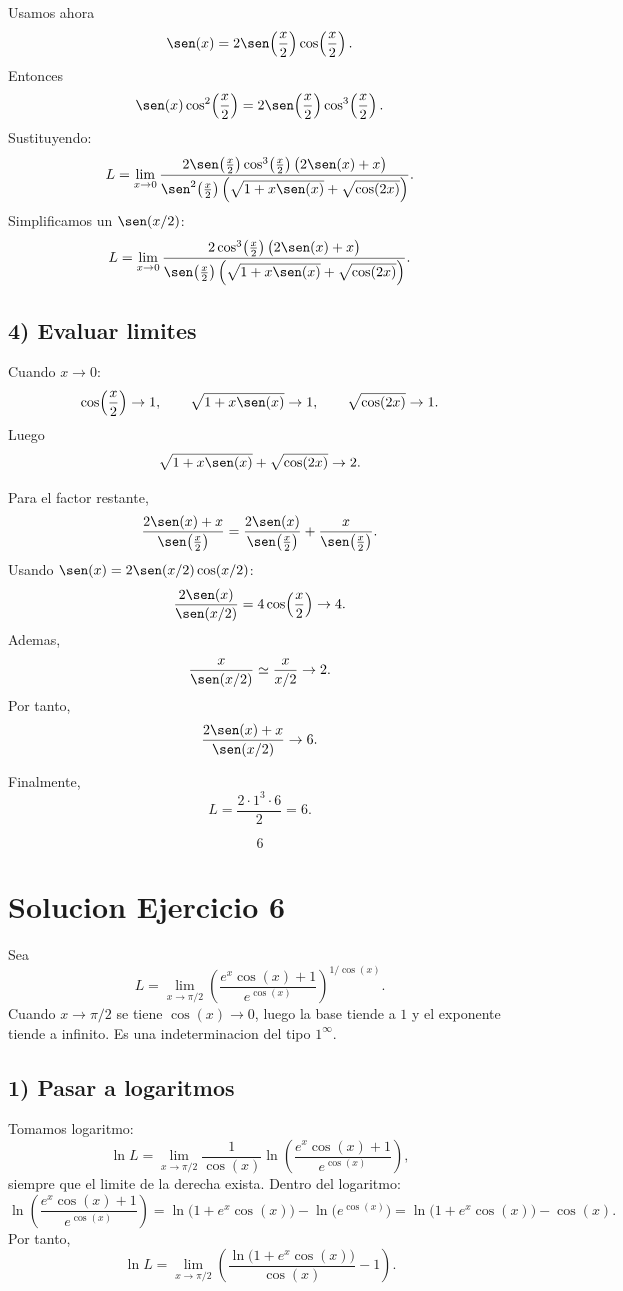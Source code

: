 \documentclass[12pt]{article}
\begin{document}
Usamos ahora
\[
\sen(x)=2\sen\!\left(\frac{x}{2}\right)\cos\!\left(\frac{x}{2}\right).
\]
Entonces
\[
\sen(x)\cos^2\!\left(\frac{x}{2}\right)
=
2\sen\!\left(\frac{x}{2}\right)\cos^3\!\left(\frac{x}{2}\right).
\]
Sustituyendo:
\[
L=\lim_{x\to 0}
\frac{2\sen\!\left(\frac{x}{2}\right)\cos^3\!\left(\frac{x}{2}\right)\bigl(2\sen(x)+x\bigr)}
{\sen^2\!\left(\frac{x}{2}\right)\left(\sqrt{1+x\sen(x)}+\sqrt{\cos(2x)}\right)}.
\]
Simplificamos un $\sen(x/2)$:
\[
L=\lim_{x\to 0}
\frac{2\cos^3\!\left(\frac{x}{2}\right)\bigl(2\sen(x)+x\bigr)}
{\sen\!\left(\frac{x}{2}\right)\left(\sqrt{1+x\sen(x)}+\sqrt{\cos(2x)}\right)}.
\]

\subsection*{4) Evaluar limites}

Cuando $x\to 0$:
\[
\cos\!\left(\frac{x}{2}\right)\to 1,
\qquad
\sqrt{1+x\sen(x)}\to 1,
\qquad
\sqrt{\cos(2x)}\to 1.
\]
Luego
\[
\sqrt{1+x\sen(x)}+\sqrt{\cos(2x)}\to 2.
\]

Para el factor restante,
\[
\frac{2\sen(x)+x}{\sen\!\left(\frac{x}{2}\right)}
=
\frac{2\sen(x)}{\sen\!\left(\frac{x}{2}\right)}
+\frac{x}{\sen\!\left(\frac{x}{2}\right)}.
\]
Usando $\sen(x)=2\sen(x/2)\cos(x/2)$:
\[
\frac{2\sen(x)}{\sen(x/2)}
=4\cos\!\left(\frac{x}{2}\right)\to 4.
\]
Ademas,
\[
\frac{x}{\sen(x/2)} \simeq \frac{x}{x/2}\to 2.
\]
Por tanto,
\[
\frac{2\sen(x)+x}{\sen(x/2)}\to 6.
\]

Finalmente,
\[
L=\frac{2\cdot 1^3\cdot 6}{2}=6.
\]

\[
\boxed{6}
\]
\section*{Solucion Ejercicio 6}

Sea
\[
L=\lim_{x\to \pi/2}\left(\frac{e^x\cos(x)+1}{e^{\cos(x)}}\right)^{1/\cos(x)}.
\]
Cuando $x\to \pi/2$ se tiene $\cos(x)\to 0$, luego la base tiende a $1$ y el exponente tiende a infinito. Es una indeterminacion del tipo $1^\infty$.

\subsection*{1) Pasar a logaritmos}
Tomamos logaritmo:
\[
\ln L=\lim_{x\to \pi/2}\frac{1}{\cos(x)}\ln\left(\frac{e^x\cos(x)+1}{e^{\cos(x)}}\right),
\]
siempre que el limite de la derecha exista. Dentro del logaritmo:
\[
\ln\left(\frac{e^x\cos(x)+1}{e^{\cos(x)}}\right)
=\ln\bigl(1+e^x\cos(x)\bigr)-\ln\bigl(e^{\cos(x)}\bigr)
=\ln\bigl(1+e^x\cos(x)\bigr)-\cos(x).
\]
Por tanto,
\[
\ln L=\lim_{x\to \pi/2}\left(\frac{\ln\bigl(1+e^x\cos(x)\bigr)}{\cos(x)}-1\right).
\]
\end{document}
